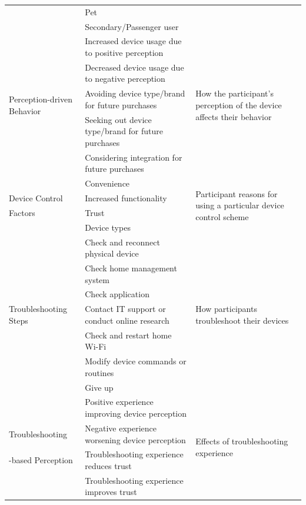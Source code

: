 \begin{table}
\begin{tabular}{p{}|p{}|p{}}
            & Pet \\
            & Secondary/Passenger user \\
        \hline
            \multirow{5}{3cm}{Perception-driven Behavior}& Increased device usage due to positive perception & \multirow{5}{4cm}{How the participant's perception of the device affects their behavior} \\
            & Decreased device usage due to negative perception \\
            & Avoiding device type/brand for future purchases \\
            & Seeking out device type/brand for future purchases \\
            & Considering integration for future purchases \\
        \hline
            & Convenience & \multirow{4}{3.5cm}{Participant reasons for using a particular device control scheme} \\
            Device Control & Increased functionality \\
            Factors & Trust \\
            & Device types \\
        \hline
            \multirow{7}{3cm}{Troubleshooting Steps} & Check and reconnect physical device & \multirow{7}{4cm}{How participants troubleshoot their devices} \\
            & Check home management system \\
            & Check application \\
            & Contact IT support or conduct online research \\
            & Check and restart home Wi-Fi \\
            & Modify device commands or routines \\
            & Give up \\
        \hline
            & Positive experience improving device perception & \multirow{4}{4cm}{Effects of troubleshooting experience} \\
            Troubleshooting & Negative experience worsening device perception \\
            -based Perception & Troubleshooting experience reduces trust\\
            & Troubleshooting experience improves trust \\
        \hline
    \end{tabular}
\end{table}
